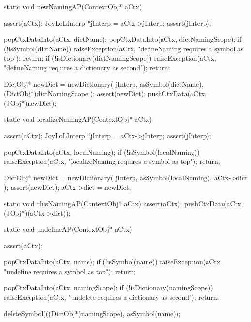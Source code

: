 \startCCode
static void newNamingAP(ContextObj* aCtx) {
  assert(aCtx);
  JoyLoLInterp *jInterp = aCtx->jInterp;
  assert(jInterp);

  popCtxDataInto(aCtx, dictName);
  popCtxDataInto(aCtx, dictNamingScope);
  if (!isSymbol(dictName)) {
    raiseException(aCtx,
      "defineNaming requires a symbol as top");
    return;
  }
  if (!isDictionary(dictNamingScope)) {
    raiseException(aCtx,
      "defineNaming requires a dictionary as second");
    return;
  }

  DictObj* newDict =
    newDictionary(
      jInterp,
      asSymbol(dictName),
      (DictObj*)dictNamingScope
    );
  assert(newDict);
  pushCtxData(aCtx, (JObj*)newDict);
}
\stopCCode

\startCCode
static void localizeNamingAP(ContextObj* aCtx) {
  assert(aCtx);
  JoyLoLInterp *jInterp = aCtx->jInterp;
  assert(jInterp);
  
  popCtxDataInto(aCtx, localNaming);
  if (!isSymbol(localNaming)){
    raiseException(aCtx,
      "localizeNaming requires a symbol as top");
    return;
  }
  
  DictObj* newDict = 
    newDictionary(
      jInterp,
      asSymbol(localNaming),
      aCtx->dict
    );
  assert(newDict);
  aCtx->dict = newDict;
}
\stopCCode

\startCCode
static void thisNamingAP(ContextObj* aCtx) {
  assert(aCtx);
  pushCtxData(aCtx, (JObj*)(aCtx->dict));
}
\stopCCode

\startCCode
static void undefineAP(ContextObj* aCtx) {
  assert(aCtx);
  
  popCtxDataInto(aCtx, name);
  if (!isSymbol(name)) {
    raiseException(aCtx,
      "undefine requires a symbol as top");
    return;
  }
  
  popCtxDataInto(aCtx, namingScope);
  if (!isDictionary(namingScope)) {
    raiseException(aCtx,
      "undelete requires a dictionary as second");
    return;
  }
  
  deleteSymbol(((DictObj*)namingScope), asSymbol(name));
  }
\stopCCode

